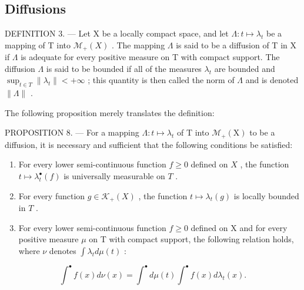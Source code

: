 \subsection{Diffusions}

DEFINITION 3. --- Let X be a locally compact space, and let \(\Lambda : t \mapsto \lambda_t\) be a mapping of T into \(\mathcal{M}_{+}(X)\) . The mapping \(\Lambda\) is said to be a diffusion of T in X if \(\Lambda\) is adequate for every positive measure on T with compact support. The diffusion \(\Lambda\) is said to be bounded if all of the measures \(\lambda_{t}\) are bounded and \(\sup_{t\in T}\|\lambda_{t}\|<+\infty\) ; this quantity is then called the norm of \(\Lambda\) and is denoted \(\|\Lambda\|\) .

The following proposition merely translates the definition:

PROPOSITION 8. --- For a mapping \(\Lambda: t \mapsto \lambda_t\) of T into \(\mathcal{M}_+(\mathrm{X})\) to be a diffusion, it is necessary and sufficient that the following conditions be satisfied:

\begin{enumerate}
\def\labelenumi{\arabic{enumi})}
\item
  For every lower semi-continuous function \(f \geqslant 0\) defined on \(X\) , the function \(t \mapsto \lambda_t^\bullet(f)\) is universally measurable on \(T\) .
\item
  For every function \(g \in \mathcal{K}_{+}(X)\) , the function \(t \mapsto \lambda_t(g)\) is locally bounded in \(T\) .
\item
  For every lower semi-continuous function \(f \geqslant 0\) defined on X and for every positive measure \(\mu\) on T with compact support, the following relation holds, where \(\nu\) denotes \(\int \lambda_{t} d\mu(t)\) :
\end{enumerate}

\[
\int^ {\bullet} f (x) d \nu (x) = \int^ {\bullet} d \mu (t) \int^ {\bullet} f (x) d \lambda_ {t} (x).\tag{12}
\]

